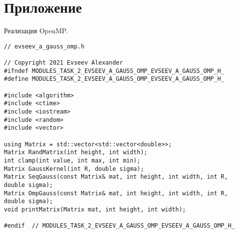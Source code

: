 \documentclass{report}
\begin{document}
\section*{Приложение}
Реализация OpenMP.
\begin{lstlisting}
// evseev_a_gauss_omp.h

// Copyright 2021 Evseev Alexander
#ifndef MODULES_TASK_2_EVSEEV_A_GAUSS_OMP_EVSEEV_A_GAUSS_OMP_H_
#define MODULES_TASK_2_EVSEEV_A_GAUSS_OMP_EVSEEV_A_GAUSS_OMP_H_

#include <algorithm>
#include <ctime>
#include <iostream>
#include <random>
#include <vector>

using Matrix = std::vector<std::vector<double>>;
Matrix RandMatrix(int height, int width);
int clamp(int value, int max, int min);
Matrix GaussKernel(int R, double sigma);
Matrix SeqGauss(const Matrix& mat, int height, int width, int R, double sigma);
Matrix OmpGauss(const Matrix& mat, int height, int width, int R, double sigma);
void printMatrix(Matrix mat, int height, int width);

#endif  // MODULES_TASK_2_EVSEEV_A_GAUSS_OMP_EVSEEV_A_GAUSS_OMP_H_


\end{lstlisting}
\end{document}
